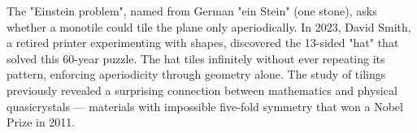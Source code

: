 The "Einstein problem", named from German "ein Stein" (one stone), asks whether a monotile could tile the plane only aperiodically. In 2023, David Smith, a retired printer experimenting with shapes, discovered the 13-sided "hat" that solved this 60-year puzzle. The hat tiles infinitely without ever repeating its pattern, enforcing aperiodicity through geometry alone. The study of tilings previously revealed a surprising connection between mathematics and physical quasicrystals — materials with impossible five-fold symmetry that won a Nobel Prize in 2011.

